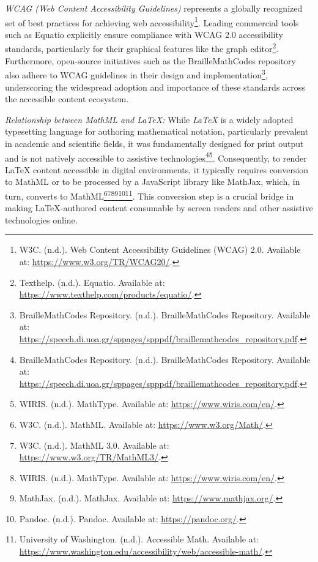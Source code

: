 \emph{WCAG (Web Content Accessibility Guidelines)} represents a globally recognized set of best practices for achieving web accessibility\footnote{W3C. (n.d.). Web Content Accessibility Guidelines (WCAG) 2.0. Available at: \url{https://www.w3.org/TR/WCAG20/}.}. Leading commercial tools such as Equatio explicitly ensure compliance with WCAG 2.0 accessibility standards, particularly for their graphical features like the graph editor\footnote{Texthelp. (n.d.). Equatio. Available at: \url{https://www.texthelp.com/products/equatio/}.}. Furthermore, open-source initiatives such as the BrailleMathCodes repository also adhere to WCAG guidelines in their design and implementation\footnote{BrailleMathCodes Repository. (n.d.). BrailleMathCodes Repository. Available at: \url{https://speech.di.uoa.gr/sppages/spppdf/braillemathcodes_repository.pdf}.}, underscoring the widespread adoption and importance of these standards across the accessible content ecosystem.

\emph{Relationship between MathML and LaTeX:} While \emph{LaTeX} is a widely adopted typesetting language for authoring mathematical notation, particularly prevalent in academic and scientific fields, it was fundamentally designed for print output and is not natively accessible to assistive technologies\footnote{BrailleMathCodes Repository. (n.d.). BrailleMathCodes Repository. Available at: \url{https://speech.di.uoa.gr/sppages/spppdf/braillemathcodes_repository.pdf}.}\footnote{WIRIS. (n.d.). MathType. Available at: \url{https://www.wiris.com/en/}.}. Consequently, to render LaTeX content accessible in digital environments, it typically requires conversion to MathML or to be processed by a JavaScript library like MathJax, which, in turn, converts to MathML\footnote{W3C. (n.d.). MathML. Available at: \url{https://www.w3.org/Math/}.}\footnote{W3C. (n.d.). MathML 3.0. Available at: \url{https://www.w3.org/TR/MathML3/}.}\footnote{WIRIS. (n.d.). MathType. Available at: \url{https://www.wiris.com/en/}.}\footnote{MathJax. (n.d.). MathJax. Available at: \url{https://www.mathjax.org/}.}\footnote{Pandoc. (n.d.). Pandoc. Available at: \url{https://pandoc.org/}.}\footnote{University of Washington. (n.d.). Accessible Math. Available at: \url{https://www.washington.edu/accessibility/web/accessible-math/}.}. This conversion step is a crucial bridge in making LaTeX-authored content consumable by screen readers and other assistive technologies online.

